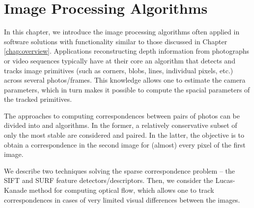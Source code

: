 
\chapter{Image Processing Algorithms}
\label{chap:algorithms}

In this chapter, we introduce the image processing algorithms often applied in software solutions with functionality similar to those discussed in Chapter \ref{chap:overview}. 
Applications reconstructing depth information from photographs or video sequences typically have at their core an algorithm that detects and tracks image primitives (such as corners, blobs, lines, individual pixels, etc.) across several photos/frames. 
This knowledge allows one to estimate the camera parameters, which in turn makes it possible to compute the spacial parameters of the tracked primitives.

The approaches to computing correspondences between pairs of photos can be divided into  and  algorithms. 
In the former, a relatively conservative subset of only the most stable  are considered and paired. 
In the latter, the objective is to obtain a correspondence in the second image for (almost) every pixel of the first image. 

We describe two techniques solving the sparse correspondence problem -- the SIFT \cite{lowe1999} and SURF \cite{surf2006} feature detectors/descriptors. 
Then, we consider the Lucas-Kanade method for computing optical flow, which allows one to track correspondences in cases of very limited visual differences between the images.

